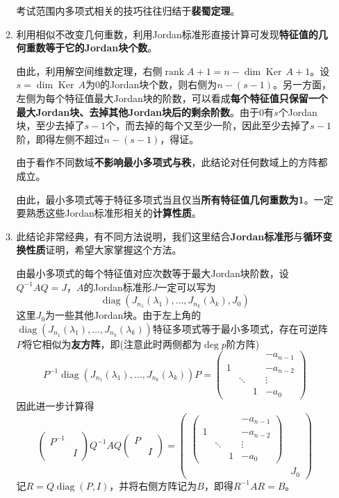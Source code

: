 \documentclass[a4paper,UTF8,fontset=windows,AutoFakeBold]{ctexart}
\DeclareMathOperator{\diag}{diag}
\DeclareMathOperator{\rank}{rank}
\DeclareMathOperator{\Ker}{Ker\,}
\newcommand*{\note}{\noindent *}
\begin{document}
\begin{enumerate}
\begin{enumerate}
        \note 考试范围内多项式相关的技巧往往归结于\textbf{裴蜀定理}。

        \item 利用相似不改变几何重数，利用Jordan标准形直接计算可发现\textbf{特征值的几何重数等于它的Jordan块个数}。
        
        由此，利用解空间维数定理，右侧$\rank A+1=n-\dim\Ker A+1$。设$s=\dim\Ker A$为0的Jordan块个数，则右侧为$n-(s-1)$。另一方面，左侧为每个特征值最大Jordan块的阶数，可以看成\textbf{每个特征值只保留一个最大Jordan块、去掉其他Jordan块后的剩余阶数}。由于0有$s$个Jordan块，至少去掉了$s-1$个，而去掉的每个又至少一阶，因此至少去掉了$s-1$阶，即得左侧不超过$n-(s-1)$，得证。

        \note 由于看作不同数域\textbf{不影响最小多项式与秩}，此结论对任何数域上的方阵都成立。

        \note 由此，最小多项式等于特征多项式当且仅当\textbf{所有特征值几何重数为1}。一定要熟悉这些Jordan标准形相关的\textbf{计算性质}。

        \item \note 此结论非常经典，有不同方法说明，我们这里结合\textbf{Jordan标准形}与\textbf{循环变换性质}证明，希望大家掌握这个方法。
        
        由最小多项式的每个特征值对应次数等于最大Jordan块阶数，设$Q^{-1}AQ=J$，$A$的Jordan标准形$J$一定可以写为
        $$\diag(J_{n_1}(\lambda_1),\dots,J_{n_k}(\lambda_k),J_0)$$
        这里$J_0$为一些其他Jordan块。由于左上角的$\diag(J_{n_1}(\lambda_1),\dots,J_{n_k}(\lambda_k))$特征多项式等于最小多项式，存在可逆阵$P$将它相似为\textbf{友方阵}，即(注意此时两侧都为$\deg p$阶方阵)
        $$P^{-1}\diag(J_{n_1}(\lambda_1),\dots,J_{n_k}(\lambda_k))P=\begin{pmatrix} &&&-a_{n-1}\\1&&&-a_{n-2}\\ &\ddots&&\vdots\\ &&1&-a_0\end{pmatrix}$$
        因此进一步计算得
        $$\begin{pmatrix}P^{-1}\\ &I\end{pmatrix}Q^{-1}AQ\begin{pmatrix}P\\ &I\end{pmatrix}=\begin{pmatrix}\begin{pmatrix} &&&-a_{n-1}\\1&&&-a_{n-2}\\ &\ddots&&\vdots\\ &&1&-a_0\end{pmatrix}\\ &J_0\end{pmatrix}$$
        记$R=Q\diag(P,I)$，并将右侧方阵记为$B$，即得$R^{-1}AR=B$。


\end{enumerate}
\end{enumerate}
\end{document}
